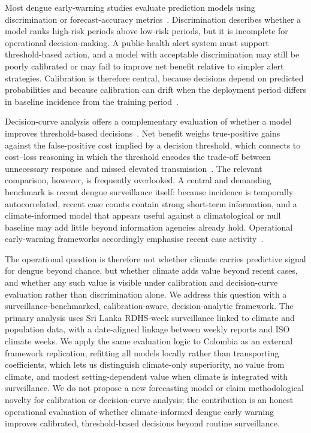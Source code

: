 \documentclass[11pt,a4paper]{article}
\begin{document}
Most dengue early-warning studies evaluate prediction models using discrimination or forecast-accuracy metrics~\cite{Johansson2019,Baharom2022,HussainAlkhateeb2021,Lowe2021}. Discrimination describes whether a model ranks high-risk periods above low-risk periods, but it is incomplete for operational decision-making. A public-health alert system must support threshold-based action, and a model with acceptable discrimination may still be poorly calibrated or may fail to improve net benefit relative to simpler alert strategies. Calibration is therefore central, because decisions depend on predicted probabilities and because calibration can drift when the deployment period differs in baseline incidence from the training period~\cite{VanCalster2019,VanCalster2023,SteyerbergVergouwe2014}.

Decision-curve analysis offers a complementary evaluation of whether a model improves threshold-based decisions~\cite{Vickers2006,Vickers2016,Vickers2019}. Net benefit weighs true-positive gains against the false-positive cost implied by a decision threshold, which connects to cost--loss reasoning in which the threshold encodes the trade-off between unnecessary response and missed elevated transmission~\cite{Murphy1985,Tozan2023}. The relevant comparison, however, is frequently overlooked. A central and demanding benchmark is recent dengue surveillance itself: because incidence is temporally autocorrelated, recent case counts contain strong short-term information, and a climate-informed model that appears useful against a climatological or null baseline may add little beyond information agencies already hold. Operational early-warning frameworks accordingly emphasise recent case activity~\cite{EWARScsd}.

The operational question is therefore not whether climate carries predictive signal for dengue beyond chance, but whether climate adds value beyond recent cases, and whether any such value is visible under calibration and decision-curve evaluation rather than discrimination alone. We address this question with a surveillance-benchmarked, calibration-aware, decision-analytic framework. The primary analysis uses Sri Lanka RDHS-week surveillance linked to climate and population data, with a date-aligned linkage between weekly reports and ISO climate weeks. We apply the same evaluation logic to Colombia as an external framework replication, refitting all models locally rather than transporting coefficients, which lets us distinguish climate-only superiority, no value from climate, and modest setting-dependent value when climate is integrated with surveillance. We do not propose a new forecasting model or claim methodological novelty for calibration or decision-curve analysis; the contribution is an honest operational evaluation of whether climate-informed dengue early warning improves calibrated, threshold-based decisions beyond routine surveillance.
\end{document}
